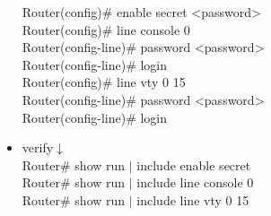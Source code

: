 \documentclass{article}
\begin{document}
\begin{itemize}
  		Router(config)\# enable secret \textless password\textgreater\\
  		
  		Router(config)\# line console 0\\
  		Router(config-line)\# password \textless password\textgreater\\
  		Router(config-line)\# login\\
  		
  		Router(config)\# line vty 0 15\\
  		Router(config-line)\# password \textless password\textgreater\\
  		Router(config-line)\# login
  	\item[] verify$\downarrow$\\
  		Router\# show run $\mid$ include enable secret\\
  		Router\# show run $\mid$ include line console 0\\
  		Router\# show run $\mid$ include line vty 0 15
  		

\end{itemize}
\end{document}
